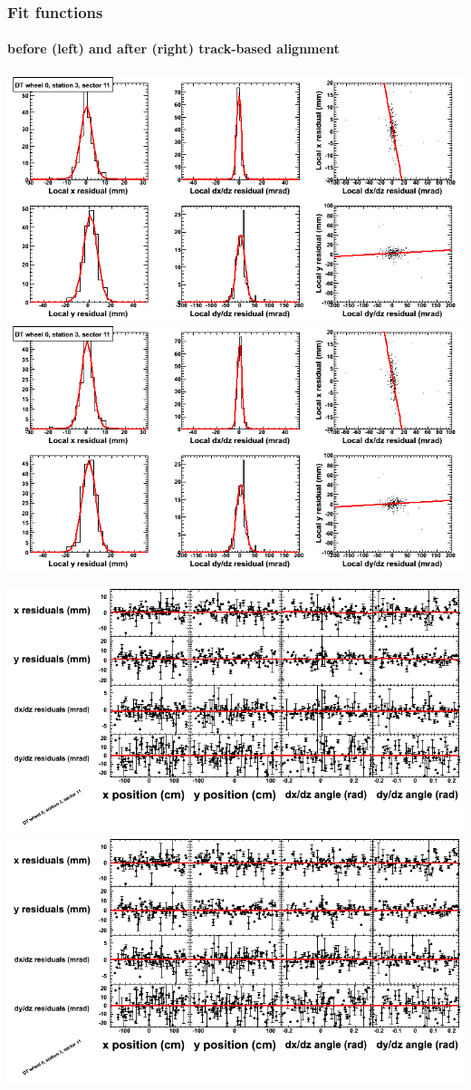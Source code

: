 \documentclass[compress]{beamer}
\begin{document}
\begin{frame}
\frametitle{Fit functions}
\framesubtitle{before (left) and after (right) track-based alignment}
\includegraphics[width=0.5\linewidth]{fitfunctions_re01/MBwhCst3sec11_bellcurves.png} \includegraphics[width=0.5\linewidth]{fitfunctions_re05/MBwhCst3sec11_bellcurves.png}

\includegraphics[width=0.5\linewidth]{fitfunctions_re01/MBwhCst3sec11_polynomials.png} \includegraphics[width=0.5\linewidth]{fitfunctions_re05/MBwhCst3sec11_polynomials.png}
\end{frame}
\end{document}
